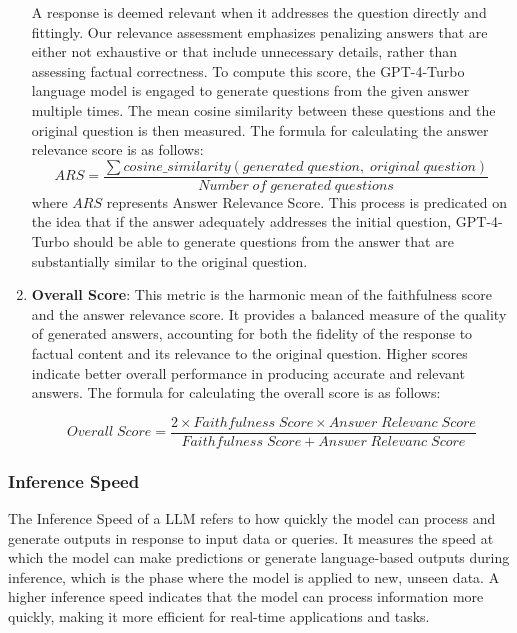 \documentclass[runningheads]{llncs}
\begin{document}
\begin{enumerate}
    A response is deemed relevant when it addresses the question directly and fittingly. Our relevance assessment emphasizes penalizing answers that are either not exhaustive or that include unnecessary details, rather than assessing factual correctness. To compute this score, the GPT-4-Turbo language model is engaged to generate questions from the given answer multiple times. The mean cosine similarity between these questions and the original question is then measured. The formula for calculating the answer relevance score is as follows\cite{es2023ragas}:
\[
    ARS = \frac{ \sum cosine\_similarity(generated\;question,\;original\;question)}{Number\;of\;generated\;questions}
\]
where $ARS$ represents Answer Relevance Score.    
    This process is predicated on the idea that if the answer adequately addresses the initial question, GPT-4-Turbo should be able to generate questions from the answer that are substantially similar to the original question.
    
    
    \item \textbf{Overall Score}: This metric is the harmonic mean of the faithfulness score and the answer relevance score. It provides a balanced measure of the quality of generated answers, accounting for both the fidelity of the response to factual content and its relevance to the original question. Higher scores indicate better overall performance in producing accurate and relevant answers. The formula for calculating the overall score is as follows:

\[
    Overall\;Score = \frac{2 \times Faithfulness\;Score \times  Answer\;Relevanc\;Score}{Faithfulness\;Score + Answer\;Relevanc\;Score}
\]
    
\end{enumerate}
\subsubsection{Inference Speed}
 The Inference Speed of a LLM refers to how quickly the model can process and generate outputs in response to input data or queries. It measures the speed at which the model can make predictions or generate language-based outputs during inference, which is the phase where the model is applied to new, unseen data. A higher inference speed indicates that the model can process information more quickly, making it more efficient for real-time applications and tasks.
\end{document}
